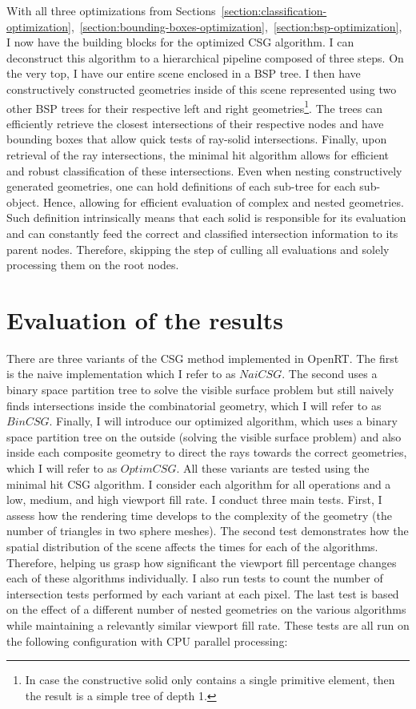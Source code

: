 \documentclass[a4paper,11pt,oneside]{article}
\begin{document}
With all three optimizations from Sections~\ref{section:classification-optimization},~\ref{section:bounding-boxes-optimization},~\ref{section:bsp-optimization}, I now have the building blocks for the optimized CSG algorithm. I can deconstruct this algorithm to a hierarchical pipeline composed of three steps. On the very top, I have our entire scene enclosed in a BSP tree. I then have constructively constructed geometries inside of this scene represented using two other BSP trees for their respective left and right geometries\footnote{In case the constructive solid only contains a single primitive element, then the result is a simple tree of depth 1.}. The trees can efficiently retrieve the closest intersections of their respective nodes and have bounding boxes that allow quick tests of ray-solid intersections. Finally, upon retrieval of the ray intersections, the minimal hit algorithm allows for efficient and robust classification of these intersections. Even when nesting constructively generated geometries, one can hold definitions of each sub-tree for each sub-object. Hence, allowing for efficient evaluation of complex and nested geometries.  Such definition intrinsically means that each solid is responsible for its evaluation and can constantly feed the correct and classified intersection information to its parent nodes. Therefore, skipping the step of culling all evaluations and solely processing them on the root nodes.

\section{Evaluation of the results}

There are three variants of the CSG method implemented in OpenRT. The first is the naive implementation which I refer to as $NaiCSG$. The second uses a binary space partition tree to solve the visible surface problem but still naively finds intersections inside the combinatorial geometry, which I will refer to as $BinCSG$. Finally, I will introduce our optimized algorithm, which uses a binary space partition tree on the outside (solving the visible surface problem) and also inside each composite geometry to direct the rays towards the correct geometries, which I will refer to as $OptimCSG$. All these variants are tested using the minimal hit CSG algorithm. I consider each algorithm for all operations and a low, medium, and high viewport fill rate. I conduct three main tests. First, I assess how the rendering time develops to the complexity of the geometry (the number of triangles in two sphere meshes). The second test demonstrates how the spatial distribution of the scene affects the times for each of the algorithms. Therefore, helping us grasp how significant the viewport fill percentage changes each of these algorithms individually. I also run tests to count the number of intersection tests performed by each variant at each pixel. The last test is based on the effect of a different number of nested geometries on the various algorithms while maintaining a relevantly similar viewport fill rate. These tests are all run on the following configuration with CPU parallel processing:
\end{document}
